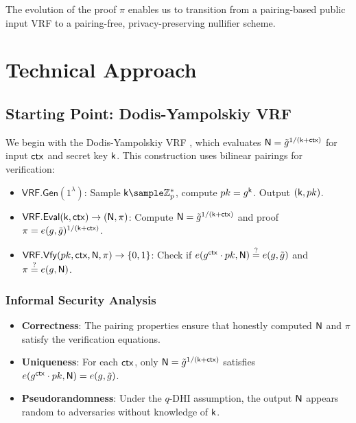 The evolution of the proof $\pi$ enables us to transition from a pairing-based public input VRF to a pairing-free, privacy-preserving nullifier scheme.







\section{Technical Approach}

\subsection{Starting Point: Dodis-Yampolskiy VRF}
We begin with the Dodis-Yampolskiy VRF \cite{hutchison_verifiable_2005}, which evaluates $\mathsf{N} = \tilde{g}^{1/(\mathsf{k} + \mathsf{ctx})}$ for input $\mathsf{ctx}$ and secret key $\mathsf{k}$. This construction uses bilinear pairings for verification:

\begin{itemize}
    \item $\mathsf{VRF.Gen}(1^\lambda)$: Sample $\k \sample \mathbb{Z}_p^*$, compute $pk = g^{\mathsf{k}}$. Output $(\mathsf{k}, pk)$.
    \item $\mathsf{VRF.Eval}(\mathsf{k}, \mathsf{ctx}) \to (\mathsf{N}, \pi)$: Compute $\mathsf{N} = \tilde{g}^{1/(\mathsf{k} + \mathsf{ctx})}$ and proof $\pi = e(g, \tilde{g})^{1/(\mathsf{k} + \mathsf{ctx})}$.
    \item $\mathsf{VRF.Vfy}(pk, \mathsf{ctx}, \mathsf{N}, \pi) \to \{0, 1\}$: Check if $e(g^{\mathsf{ctx}} \cdot pk, \mathsf{N}) \stackrel{?}{=} e(g, \tilde{g})$ and $\pi \stackrel{?}{=} e(g, \mathsf{N})$.
\end{itemize}

\subsubsection{Informal Security Analysis}
\begin{itemize}
    \item \textbf{Correctness}: The pairing properties ensure that honestly computed $\mathsf{N}$ and $\pi$ satisfy the verification equations.
    \item \textbf{Uniqueness}: For each $\mathsf{ctx}$, only $\mathsf{N} = \tilde{g}^{1/(\mathsf{k} + \mathsf{ctx})}$ satisfies $e(g^{\mathsf{ctx}} \cdot pk, \mathsf{N}) = e(g, \tilde{g})$.
    \item \textbf{Pseudorandomness}: Under the $q$-DHI assumption, the output $\mathsf{N}$ appears random to adversaries without knowledge of $\mathsf{k}$.
\end{itemize}

